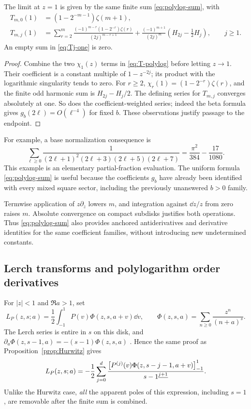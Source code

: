\begin{corollary}\label{cor:polylog-endpoint}
The limit at $z=1$ is given by the same finite sum
\eqref{eq:polylog-sum}, with
\begin{align}
 T_{m,0}(1)&=(1-2^{-m-1})\zeta(m+1),\label{eq:T0-one}\\
 T_{m,j}(1)&=\sum_{r=2}^m
 \frac{(-1)^{m-r}(1-2^{-r})\zeta(r)}{(2j)^{m-r+1}}
 +\frac{(-1)^{m+1}}{(2j)^m}
       \left(H_{2j}-\frac12H_j\right),\qquad j\ge1.
 \label{eq:Tj-one}
\end{align}
An empty sum in \eqref{eq:Tj-one} is zero.
\end{corollary}
\begin{proof}
Combine the two $\chi_1(z)$ terms in \eqref{eq:T-polylog} before
letting $z\to1$. Their coefficient is a constant multiple of
$1-z^{-2j}$; its product with the logarithmic singularity tends to zero.
For $r\ge2$, $\chi_r(1)=(1-2^{-r})\zeta(r)$, and the finite odd
harmonic sum is $H_{2j}-H_j/2$. The defining series for $T_{m,j}$
converges absolutely at one. So does the coefficient-weighted series;
indeed the beta formula gives $g_b(2\ell)=O(\ell^{-4})$ for fixed $b$.
These observations justify passage to the endpoint.
\end{proof}

For example, a base normalization consequence is
\begin{equation}\label{eq:example-odd-sum}
 \sum_{\ell\ge0}
 \frac1{(2\ell+1)^2(2\ell+3)(2\ell+5)(2\ell+7)}
 =\frac{\pi^2}{384}-\frac{17}{1080}.
\end{equation}
This example is an elementary partial-fraction evaluation. The uniform
formula \eqref{eq:polylog-sum} is useful because the coefficients
$g_b$ have already been identified with every mixed square sector,
including the previously unanswered $b>0$ family.

Termwise application of $z\partial_z$ lowers $m$, and integration
against $\dd z/z$ from zero raises $m$. Absolute convergence on compact
subdisks justifies both operations. Thus \eqref{eq:polylog-sum} also
provides anchored antiderivatives and derivative identities for the same
coefficient families, without introducing new undetermined constants.

\subsection{Lerch transforms and polylogarithm order derivatives}
For $|z|<1$ and $\Re a>1$, set
\[
 L_P(z,s;a)=\frac12\int_{-1}^1P(v)\Phi(z,s,a+v)\dd v,
 \qquad
 \Phi(z,s,a)=\sum_{n\ge0}\frac{z^n}{(n+a)^s}.
\]
The Lerch series is entire in $s$ on this disk, and
$\partial_a\Phi(z,s-1,a)=-(s-1)\Phi(z,s,a)$
\cite{DLMF14}. Hence the same proof as Proposition~\ref{prop:Hurwitz}
gives
\begin{equation}\label{eq:Lerch-endpoint}
 L_P(z,s;a)=-\frac12\sum_{j=0}^d
 \frac{\left[P^{(j)}(v)\Phi(z,s-j-1,a+v)\right]_{-1}^{1}}{s-1^{\underline{j+1}}}.
\end{equation}
Unlike the Hurwitz case, \emph{all} the apparent poles of this expression,
including $s=1$, are removable after the finite sum is combined.


